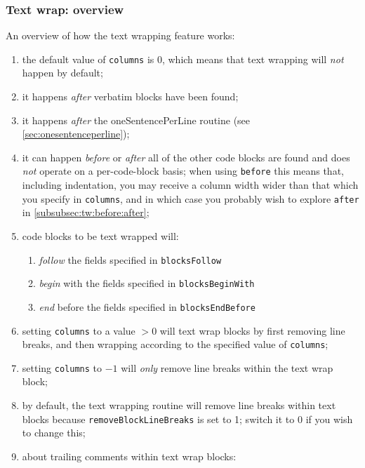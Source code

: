 \documentclass[10pt]{article}
\begin{document}
\subsubsection{Text wrap: overview}
 An overview of how the text wrapping feature works:
 \begin{enumerate}
  \item the default value of \texttt{columns} is 0, which means that text wrapping will
        \emph{not} happen by default;
  \item it happens \emph{after} verbatim blocks have been found;
  \item it happens \emph{after} the oneSentencePerLine routine (see
        \cref{sec:onesentenceperline});
  \item it can happen \emph{before} or \emph{after}  all of the other code blocks are found and does \emph{not} operate
        on a per-code-block basis; when using \texttt{before} this means that, including
        indentation, you may receive a column width wider than that which you specify in
        \texttt{columns}, and in which case you probably wish to explore \texttt{after}
        in \cref{subsubsec:tw:before:after};
  \item code blocks to be text wrapped will:
        \begin{enumerate}
         \item \emph{follow} the fields specified in \texttt{blocksFollow}
         \item \emph{begin} with the fields specified in \texttt{blocksBeginWith}
         \item \emph{end} before the fields specified in \texttt{blocksEndBefore}
        \end{enumerate}
  \item setting \texttt{columns} to a value $>0$ will text wrap blocks by first removing
        line breaks, and then wrapping according to the specified value of
        \texttt{columns};
  \item setting \texttt{columns} to $-1$ will \emph{only} remove line breaks within the
        text wrap block;
  \item by default, the text wrapping routine will remove line breaks within text blocks
        because \texttt{removeBlockLineBreaks} is set to 1; switch it to 0 if you wish to
        change this;
  \item about trailing comments within text wrap blocks:
        \begin{enumerate}

\end{enumerate}
\end{enumerate}
\end{document}

